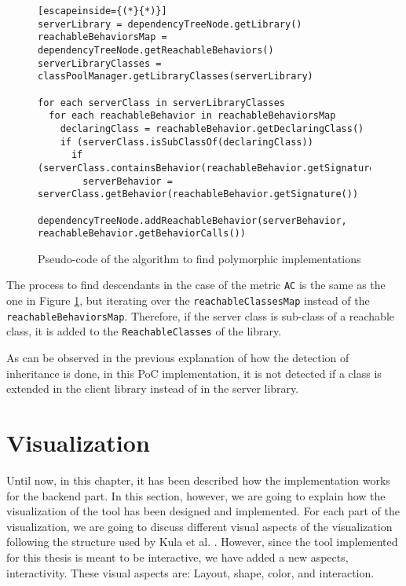 \begin{figure}[ht!]
\begin{lstlisting}[escapeinside={(*}{*)}]
serverLibrary = dependencyTreeNode.getLibrary()
reachableBehaviorsMap = dependencyTreeNode.getReachableBehaviors()
serverLibraryClasses = classPoolManager.getLibraryClasses(serverLibrary)

for each serverClass in serverLibraryClasses
  for each reachableBehavior in reachableBehaviorsMap
    declaringClass = reachableBehavior.getDeclaringClass()
    if (serverClass.isSubClassOf(declaringClass))
      if (serverClass.containsBehavior(reachableBehavior.getSignature()))
        serverBehavior = serverClass.getBehavior(reachableBehavior.getSignature())
        dependencyTreeNode.addReachableBehavior(serverBehavior, reachableBehavior.getBehaviorCalls())
\end{lstlisting}
\caption{Pseudo-code of the algorithm to find polymorphic implementations}
\label{fig:algorithm-polymorphy}
\end{figure}

The process to find descendants in the case of the metric \texttt{AC} is the same as the one in Figure \ref{fig:algorithm-polymorphy}, but iterating over the \texttt{reachableClassesMap} instead of the \texttt{reachableBehaviorsMap}. Therefore, if the server class is sub-class of a reachable class, it is added to the \texttt{ReachableClasses} of the library.

\blankl
As can be observed in the previous explanation of how the detection of inheritance is done, in this PoC implementation, it is not detected if a class is extended in the client library instead of in the server library.

\section{Visualization}
Until now, in this chapter, it has been described how the implementation works for the backend part. In this section, however, we are going to explain how the visualization of the tool has been designed and implemented.
For each part of the visualization, we are going to discuss different visual aspects of the visualization following the structure used by Kula et al. \cite{kula2014visualizing}. However, since the tool implemented for this thesis is meant to be interactive, we have added a new aspects, interactivity. These visual aspects are: Layout, shape, color, and interaction.


